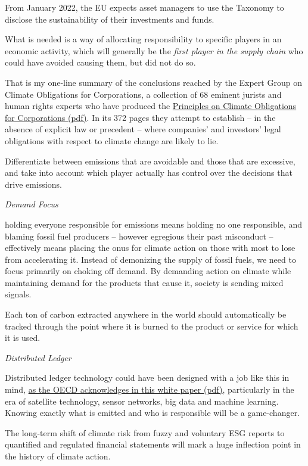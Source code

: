 \documentclass[
]{book}
\begin{document}
From January 2022, the EU expects asset managers to use the Taxonomy
to disclose the sustainability of their investments and funds.

What is needed is a way of allocating responsibility to specific players
in an economic activity,
which will generally be the \emph{first player in the supply chain}
who could have avoided causing them, but did not do so.

That is my one-line summary of the conclusions reached by the Expert Group on Climate Obligations for Corporations, a collection of 68 eminent jurists and human rights experts who have produced the \href{https://climateprinciplesforenterprises.files.wordpress.com/2021/01/epwebpdf2.pdf}{Principles on Climate Obligations for Corporations (pdf)}. In its 372 pages they attempt to establish -- in the absence of explicit law or precedent -- where companies' and investors' legal obligations with respect to climate change are likely to lie.

Differentiate between emissions that are avoidable and those that are excessive,
and take into account which player actually has control over the decisions
that drive emissions.

\emph{Demand Focus}

holding everyone responsible for emissions means holding no one responsible, and blaming fossil fuel producers -- however egregious their past misconduct -- effectively means placing the onus for climate action on those with most to lose from accelerating it. Instead of demonizing the supply of fossil fuels, we need to focus primarily on choking off demand. By demanding action on climate while maintaining demand for the products that cause it, society is sending mixed signals.

Each ton of carbon extracted anywhere in the world should automatically be tracked through the point where it is burned to the product or service for which it is used.

\emph{Distributed Ledger}

Distributed ledger technology could have been designed with a job like this in mind,
\href{https://www.oecd.org/finance/Blockchain-technologies-as-a-digital-enabler-for-sustainable-infrastructure-key-findings.pdf}{as the OECD acknowledges in this white paper (pdf)},
particularly in the era of satellite technology, sensor networks,
big data and machine learning.
Knowing exactly what is emitted and who is responsible will be a game-changer.

The long-term shift of climate risk from fuzzy and voluntary ESG reports to quantified and regulated financial statements will mark a huge inflection point in the history of climate action.
\end{document}
